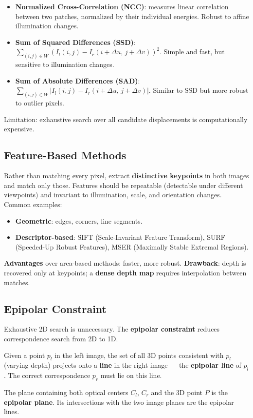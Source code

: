 \documentclass[11pt,a4paper]{article}
\theoremstyle{definition}
\theoremstyle{plain}
\theoremstyle{remark}
\begin{document}
\begin{itemize}
    \item \textbf{Normalized Cross-Correlation (NCC)}: measures linear correlation between two patches, normalized by their individual energies. Robust to affine illumination changes.
    \item \textbf{Sum of Squared Differences (SSD)}: $\sum_{(i,j)\in W}(I_l(i,j) - I_r(i+\Delta u,\, j+\Delta v))^2$. Simple and fast, but sensitive to illumination changes.
    \item \textbf{Sum of Absolute Differences (SAD)}: $\sum_{(i,j)\in W}|I_l(i,j) - I_r(i+\Delta u,\, j+\Delta v)|$. Similar to SSD but more robust to outlier pixels.
\end{itemize}

Limitation: exhaustive search over all candidate displacements is computationally expensive.

\subsection{Feature-Based Methods}

Rather than matching every pixel, extract \textbf{distinctive keypoints} in both images and match only those. Features should be repeatable (detectable under different viewpoints) and invariant to illumination, scale, and orientation changes. Common examples:

\begin{itemize}
    \item \textbf{Geometric}: edges, corners, line segments.
    \item \textbf{Descriptor-based}: SIFT (Scale-Invariant Feature Transform), SURF (Speeded-Up Robust Features), MSER (Maximally Stable Extremal Regions).
\end{itemize}

\textbf{Advantages} over area-based methods: faster, more robust.
\textbf{Drawback}: depth is recovered only at keypoints; a \textbf{dense depth map} requires interpolation between matches.

\subsection{Epipolar Constraint}

Exhaustive 2D search is unnecessary. The \textbf{epipolar constraint} reduces correspondence search from 2D to 1D.

\begin{tcolorbox}[colback=blue!5!white,colframe=blue!75!black,title=\textbf{Epipolar Geometry}]
Given a point $p_l$ in the left image, the set of all 3D points consistent with $p_l$ (varying depth) projects onto a \textbf{line} in the right image — the \textbf{epipolar line} of $p_l$. The correct correspondence $p_r$ must lie on this line.

The plane containing both optical centers $C_l$, $C_r$ and the 3D point $P$ is the \textbf{epipolar plane}. Its intersections with the two image planes are the epipolar lines.
\end{tcolorbox}
\end{document}
